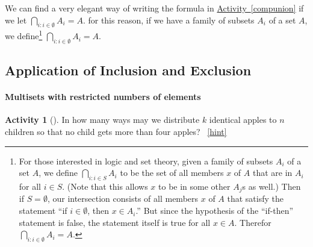 \documentclass[10pt,]{book}
\theoremstyle{plain}
\theoremstyle{definition}
\theoremstyle{definition}
\theoremstyle{definition}
\newtheorem{activity}[project]{Activity}
\numberwithin{equation}{chapter}
\begin{document}
We can find a very elegant way of writing the formula in \hyperref[compunion]{Activity~\ref{compunion}} if we let \(\bigcap_{i:i\in\emptyset}A_i = A\).  for this reason, if we have a family of subsets \(A_i\) of a set \(A\), we define\footnote{For those interested in logic and set theory, given a family of subsets \(A_i\) of a set \(A\), we define \(\bigcap_{i:i\in S}A_i\) to be the set of all members \(x\) of \(A\) that are in \(A_i\) for all \(i \in S\).  (Note that this allows \(x\) to be in some other \(A_j\)s as well.)  Then if \(S = \emptyset\), our intersection consists of all members \(x\) of \(A\) that satisfy the statement ``if \(i\in \emptyset\), then \(x \in A_i\).'' But since the hypothesis of the ``if-then'' statement is false, the statement itself is true for all \(x \in A\).  Therefor \(\bigcap_{i:i \in \emptyset}A_i = A\).\label{fn-4}} \(\bigcap_{i:i\in\emptyset}A_i = A\).%
\typeout{************************************************}
\typeout{************************************************}
\subsection[{Application of Inclusion and Exclusion}]{Application of Inclusion and Exclusion}\label{subsection-18}
\typeout{************************************************}
\typeout{************************************************}
\paragraph[{Multisets with restricted numbers of elements}]{Multisets with restricted numbers of elements}\hypertarget{paragraphs-2}{}
\begin{activity}[]\label{act_restrictedmultisetspie}
\hypertarget{p-789}{}%
In how many ways may we distribute \(k\) identical apples to \(n\) children so that no child gets more than four apples?%
~\hfill{\tiny\hyperlink{a-163}{[hint]}\hypertarget{q-163}{}}\end{activity}
\typeout{************************************************}
\typeout{************************************************}
\end{document}
